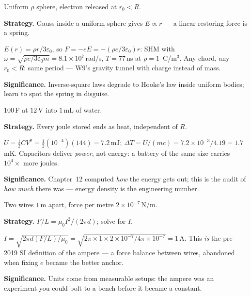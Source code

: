 \begin{example}\label{ex:w23}
Uniform $\rho$ sphere, electron released at $r_0<R$.
\par\smallskip
\textbf{Strategy.} Gauss inside a uniform sphere gives $E\propto r$
--- a linear restoring force is a spring.
\begin{solution}
$E(r)=\rho r/3\varepsilon_0$, so $F=-eE=-(\rho e/3\varepsilon_0)r$:
SHM with $\omega=\sqrt{\rho e/3\varepsilon_0m}
=8.1\times10^{7}$\,rad/s, $T=77$\,ns at $\rho=1$\,\textmu
C/m$^{3}$.
Any chord, any $r_0<R$: same period --- W9's gravity tunnel with
charge instead of mass. \checkmark
\end{solution}
\textbf{Significance.} Inverse-square laws degrade to Hooke's law
inside uniform bodies; learn to spot the spring in disguise.
\end{example}

\begin{example}\label{ex:w24}
$100$\,\textmu F at $12$\,V into $1$\,mL of water.
\par\smallskip
\textbf{Strategy.} Every joule stored ends as heat, independent of
$R$.
\begin{solution}
$U=\tfrac12CV^{2}=\tfrac12(10^{-4})(144)=7.2$\,mJ;
$\Delta T=U/(mc)=7.2\times10^{-3}/4.19=1.7$\,mK.
Capacitors deliver \emph{power}, not energy: a battery of the same
size carries $10^{4}\times$ more joules. \checkmark
\end{solution}
\textbf{Significance.} Chapter~12 computed \emph{how} the energy gets
out; this is the audit of \emph{how much} there was --- energy
density is the engineering number.
\end{example}

\begin{example}\label{ex:w25}
Two wires $1$\,m apart, force per metre $2\times10^{-7}$\,N/m.
\par\smallskip
\textbf{Strategy.} $F/L=\mu_0I^{2}/(2\pi d)$; solve for $I$.
\begin{solution}
$I=\sqrt{2\pi d(F/L)/\mu_0}
=\sqrt{2\pi\times1\times2\times10^{-7}/4\pi\times10^{-7}}=1$\,A.
This \emph{is} the pre-2019 SI definition of the ampere --- a force
balance between wires, abandoned when fixing $e$ became the better
anchor. \checkmark
\end{solution}
\textbf{Significance.} Units come from measurable setups: the ampere
was an experiment you could bolt to a bench before it became a
constant.
\end{example}

